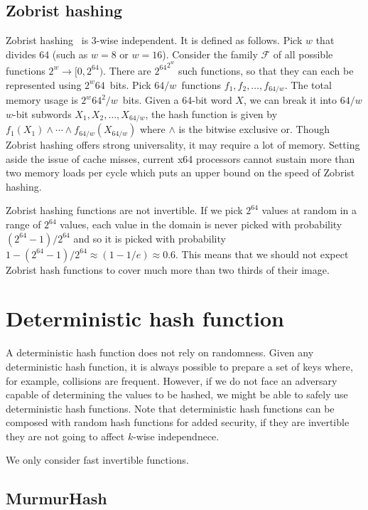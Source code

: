 \documentclass{article}
\newcommand\xor{\wedge}
\begin{document}
\subsection{Zobrist hashing}


Zobrist hashing~\cite{zobrist1970, zobrist1990new,thorup2012tabulation,Patrascu:2012:PST:2220357.2220361} is 3-wise independent. It is defined as follows. Pick $w$ that divides 64 (such as $w=8$ or $w=16$).
Consider the family $\mathcal{F}$ of all possible functions $2^w \to [0,2^64)$. There are ${2^64}^{2^w}$ such functions, so that they can each be represented using $2^w 64$~bits. Pick $64/w$~functions $f_1, f_2, \ldots, f_{64/w}$. The total memory usage is $2^w 64^2/w$~bits. 
Given a 64-bit word $X$, we can break it into $64/w$ $w$-bit subwords $X_1,X_2, \ldots, X_{64/w}$, 
the hash function is given by $ f_1(X_1) \xor \cdots \xor  f_{64/w}(X_{64/w})$ where $\xor{}$ is the bitwise exclusive or. Though Zobrist hashing offers strong universality, it may require a lot of memory. Setting aside the issue of cache misses, current x64 processors cannot sustain more than two memory loads per cycle which puts an upper bound on the speed of Zobrist hashing.

Zobrist hashing functions are not invertible.
If we pick $2^{64}$ values at random in a range of $2^{64}$ values, each value in the domain is never picked with probability $(2^{64}-1)/2^{64}$ and so it is picked with probability  $1-(2^{64}-1)/2^{64} \approx (1-1/e) \approx 0.6$. This means that we should not expect Zobrist hash functions to cover much more than two thirds of their image.

\section{Deterministic hash function}

A deterministic hash function does not rely on randomness.
Given any deterministic hash function, it is always possible to prepare a set of keys where, for example, collisions are frequent. However, if we do not face an adversary capable of determining the values to be hashed, we might be able to  safely use deterministic hash functions. Note that deterministic hash functions can be composed with random hash functions for added security, if they are invertible they are not going to affect $k$-wise independnece.

We only consider fast invertible functions.

\subsection{MurmurHash}
\end{document}
